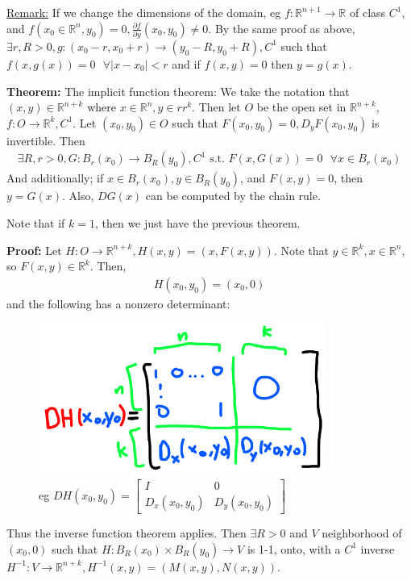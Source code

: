 \documentclass{article}
\newcommand*{\txt}[1]{\text{ #1 }}%
\newcommand*{\fora}{\txt{}\forall}%
\newcommand*{\rr}{\mathbb{R}}%
\newcommand*{\partials}[2]{\frac{\partial #1}{\partial #2}}%
\begin{document}
\underline{Remark:} If we change the dimensions of the domain, eg $f:\rr^{n+1}\to \rr$ of class $C^1$, and $f(x_0\in\rr^n,y_0)=0,\partials{f}{y}(x_0,y_0)\neq 0$. By the same proof as above, $\exists r,R>0,g:(x_0-r,x_0+r)\to (y_0-R,y_0+R), C^1$ such that $f(x,g(x))=0\fora |x-x_0|<r$ and if $f(x,y)=0$ then $y=g(x)$.

\textbf{Theorem:} The implicit function theorem: We take the notation that $(x,y)\in \rr^{n+k}$ where $x\in \rr^n, y\in rr^k$. Then let $O$ be the open set in $\rr^{n+k}$, $f:O\to \rr^k, C^1$. Let $(x_0,y_0)\in O$ such that $F(x_0,y_0)=0, D_yF(x_0,y_0)$ is invertible. Then \begin{align*}
    \exists R, r>0, G:B_r(x_0)\to B_R(y_0), C^1\txt{s.t.}F(x,G(x))=0\fora x\in B_r(x_0)
\end{align*}And additionally; if $x\in B_r(x_0), y\in B_R(y_0)$, and $F(x,y)=0$, then $y=G(x)$. Also, $DG(x)$ can be computed by the chain rule. 

Note that if $k=1$, then we just have the previous theorem.

\textbf{Proof:} Let $H:O\to \rr^{n+k}, H(x,y)=(x,F(x,y))$. Note that $y\in \rr^k, x\in \rr^n$, so $F(x,y)\in \rr^k$. Then, \begin{align*}
    H(x_0,y_0)=(x_0,0)
\end{align*}and the following has a nonzero determinant:

\begin{figure}[H]
    \centering
    \includegraphics[height=5cm]{fig4.png}
    \caption{eg $DH(x_0,y_0)=\begin{bmatrix}
        I & 0\\
        D_x(x_0,y_0) & D_y(x_0,y_0)
    \end{bmatrix}$}
    \label{fig:fig4}
\end{figure}

Thus the inverse function theorem applies. Then $\exists R>0$ and $V$ neighborhood of $(x_0,0)$ such that $H:B_R(x_0)\times B_R(y_0)\to V$ is 1-1, onto, with a $C^1$ inverse $H^{-1}:V\to \rr^{n+k}, H^{-1}(x,y)=(M(x,y),N(x,y))$.
\end{document}
